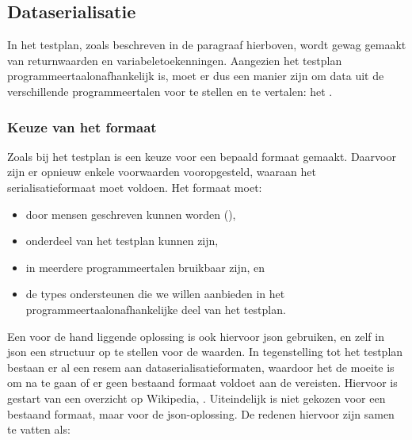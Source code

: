 \subsection{Dataserialisatie}\label{subsec:dataserialisatie}

In het testplan, zoals beschreven in de paragraaf hierboven, wordt gewag gemaakt van returnwaarden en variabeletoekenningen.
Aangezien het testplan programmeertaalonafhankelijk is, moet er dus een manier zijn om data uit de verschillende programmeertalen voor te stellen en te vertalen: het .

\subsubsection{Keuze van het formaat}

Zoals bij het testplan is een keuze voor een bepaald formaat gemaakt.
Daarvoor zijn er opnieuw enkele voorwaarden vooropgesteld, waaraan het serialisatieformaat moet voldoen.
Het formaat moet:

\begin{itemize}
    \item door mensen geschreven kunnen worden (),
    \item onderdeel van het testplan kunnen zijn,
    \item in meerdere programmeertalen bruikbaar zijn, en
    \item de types ondersteunen die we willen aanbieden in het programmeertaalonafhankelijke deel van het testplan.
\end{itemize}

Een voor de hand liggende oplossing is ook hiervoor json gebruiken, en zelf in json een structuur op te stellen voor de waarden.
In tegenstelling tot het testplan bestaan er al een resem aan dataserialisatieformaten, waardoor het de moeite is om na te gaan of er geen bestaand formaat voldoet aan de vereisten.
Hiervoor is gestart van een overzicht op Wikipedia, \autocite{wiki2020}.
Uiteindelijk is niet gekozen voor een bestaand formaat, maar voor de json-oplossing.
De redenen hiervoor zijn samen te vatten als:

